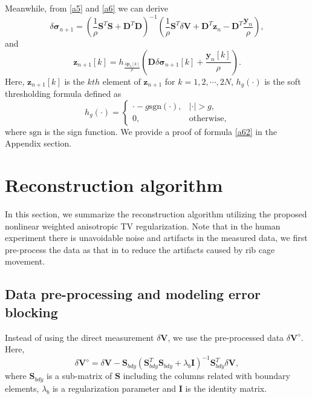 \documentclass[lettersize,journal]{IEEEtran}
\begin{document}
Meanwhile, from \eqref{a5} and \eqref{a6} we can derive
\begin{equation}
\label{a51}
\delta\bm{\sigma}_{n+1}=(\frac{1}{\rho}\mathbf{S}^{T}\mathbf{S}+\mathbf{D}^{T}\mathbf{D})^{-1}(\frac{1}{\rho}\mathbf{S}^{T}\delta\mathbf{V}+\mathbf{D}^{T}\mathbf{z}_{n}-\mathbf{D}^{T}\frac{\mathbf{y}_{n}}{\rho}),
 \end{equation}
and
\begin{equation}\label{a62}
\mathbf{z}_{n+1}[k]=h_{\frac{\lambda\mathbf{p}_{n}[k]}{\rho}}(\mathbf{D}\delta\bm{\sigma}_{n+1}[k]+\frac{\mathbf{y}_{n}[k]}{\rho}).
\end{equation}
Here, $\mathbf{z}_{n+1}[k]$ is the $kth$ element of $\mathbf{z}_{n+1}$ for $k=1,2,\cdots,2N$, $h_{g}(\cdot)$ is the soft thresholding formula defined as \cite{Daubechies2004}
 \begin{equation}\label{def:h_g}
 h_{g}(\cdot)=
  \left\{\begin{array}{ll}
  \cdot-g\mbox{sgn}(\cdot),&|\cdot|>g,\\
0, & \mbox{otherwise},
\end{array}\right.
\end{equation}
where $\mbox{sgn}$ is the sign function. We provide a proof of formula \eqref{a62} in the Appendix section.

\section{Reconstruction algorithm}

In this section, we summarize the reconstruction algorithm utilizing the proposed nonlinear weighted anisotropic TV regularization. Note that in the human experiment there is unavoidable noise and artifacts in the measured data, we first pre-process the data as that in \cite{Lee2018} to reduce the artifacts caused by rib cage movement\cite{liu2015nonlinear}.

\subsection{Data pre-processing and modeling error blocking}
Instead of using the direct measurement $\delta\mathbf{V}$, we use the pre-processed data $\delta\mathbf{V}^\diamond$.
Here,
\begin{equation*}
\delta \mathbf{V}^\diamond = \delta\mathbf{V} - \mathbf{S}_{bdy}(\mathbf{S}^{T}_{bdy}\mathbf{S}_{bdy}+\lambda_{b}\mathbf{I})^{-1}\mathbf{S}_{bdy}^{T}\delta \mathbf{V},
\end{equation*}
where $\mathbf{S}_{bdy}$ is a sub-matrix of $\mathbf{S}$ including the columns related with boundary elements, $\lambda_b$ is a regularization parameter and $\mathbf{I}$ is the identity matrix.
\end{document}
